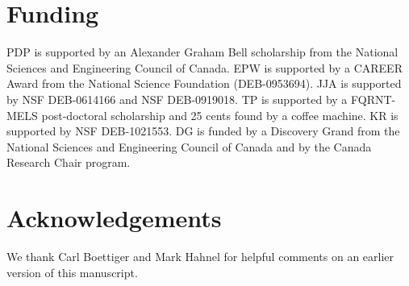 \documentclass[letterpaper,twocolumn,superscriptaddress,showkeys,longbibliography]{revtex4-1}
\begin{document}
\section{Funding}

PDP is supported by an Alexander Graham Bell scholarship from the National
Sciences and Engineering Council of Canada. EPW is supported by a CAREER Award
from the National Science Foundation (DEB-0953694). JJA is supported by NSF
DEB-0614166 and NSF DEB-0919018.  TP is supported by a FQRNT-MELS post-doctoral
scholarship and 25 cents found by a coffee machine.  KR is supported by NSF
DEB-1021553. DG is funded by a Discovery Grand from the National Sciences and
Engineering Council of Canada and by the Canada Research Chair program.

\section{Acknowledgements}

We thank Carl Boettiger and Mark Hahnel for helpful comments on an earlier
version of this manuscript.

\newpage

\end{document}
